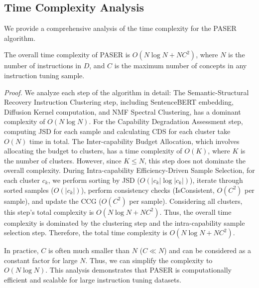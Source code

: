 


\subsection{Time Complexity Analysis}
We provide a comprehensive analysis of the time complexity for the PASER algorithm.

\begin{theorem}
The overall time complexity of PASER is $O(N\log N + NC^2)$, where $N$ is the number of instructions in $D$, and $C$ is the maximum number of concepts in any instruction tuning sample.
\end{theorem}

\textit{Proof.} We analyze each step of the algorithm in detail:
The Semantic-Structural Recovery Instruction Clustering step, including SentenceBERT embedding, Diffusion Kernel computation, and NMF Spectral Clustering, has a dominant complexity of $O(N\log N)$.
For the Capability Degradation Assessment step, computing JSD for each sample and calculating CDS for each cluster take $O(N)$ time in total.
The Inter-capability Budget Allocation, which involves allocating the budget to clusters, has a time complexity of $O(K)$, where $K$ is the number of clusters. However, since $K \leq N$, this step does not dominate the overall complexity.
During Intra-capability Efficiency-Driven Sample Selection, for each cluster $c_k$, we perform sorting by JSD ($O(|c_k|\log |c_k|)$), iterate through sorted samples ($O(|c_k|)$), perform consistency checks (IsConsistent, $O(C^2)$ per sample), and update the CCG ($O(C^2)$ per sample). Considering all clusters, this step's total complexity is $O(N\log N + NC^2)$. Thus, the overall time complexity is dominated by the clustering step and the intra-capability sample selection step. Therefore, the total time complexity is $O(N\log N + NC^2)$. 

In practice, $C$ is often much smaller than $N$ ($C \ll N$) and can be considered as a constant factor for large $N$. Thus, we can simplify the complexity to $O(N\log N)$. This analysis demonstrates that PASER is computationally efficient and scalable for large instruction tuning datasets.




